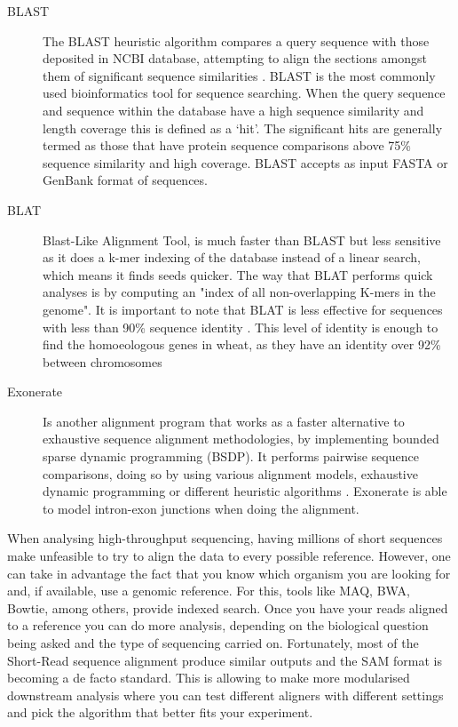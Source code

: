 \begin{description}
\item[BLAST] The BLAST heuristic algorithm compares a query sequence with those deposited in NCBI database, attempting to align the sections amongst them of significant sequence similarities \citep{Altschul1990}. BLAST is the most commonly used bioinformatics tool for sequence searching. When the query sequence and sequence within the database have a high sequence similarity and length coverage this is defined as a ‘hit’. The significant hits are generally termed as those that have protein sequence comparisons above 75\% sequence similarity and high coverage. BLAST accepts as input FASTA  or GenBank format of sequences.
\item[BLAT] Blast-Like Alignment Tool, is much faster than BLAST but less sensitive as it does a k-mer indexing of the database instead of a linear search, which means it finds seeds quicker. The way that BLAT performs quick analyses is by computing an "index of all non-overlapping K-mers in the genome". It is important to note that BLAT is less effective for sequences with less than 90\% sequence identity \citep{Kent2002}. This level of identity is enough to find the homoeologous genes in wheat, as they have an identity over 92\% between chromosomes \citep{Krasileva2013}
\item[Exonerate] Is another alignment program that works as a faster alternative to exhaustive sequence alignment methodologies, by implementing bounded sparse dynamic programming (BSDP).  It performs pairwise sequence comparisons, doing so by using various alignment models, exhaustive dynamic programming or different heuristic algorithms \citep{Slater2005}.  Exonerate is able to model intron-exon junctions when doing the alignment. 
\end{description}


When analysing high-throughput sequencing, having millions of short sequences make unfeasible to try to align the data to every possible reference. However, one can take in advantage the fact that you know which organism you are looking for and, if available, use a genomic reference. For this, tools like MAQ, BWA, Bowtie, among others, provide indexed search.  Once you have your reads aligned to a reference you can do more analysis, depending on the biological question being asked and the type of sequencing carried on.  Fortunately, most of the Short-Read sequence alignment produce similar outputs and the SAM format is becoming a de facto standard. This is allowing to make more modularised downstream analysis where you can test different aligners with different settings and pick the algorithm that better fits your experiment\cite{Liu2012,Li2009,Li2009a}. 

